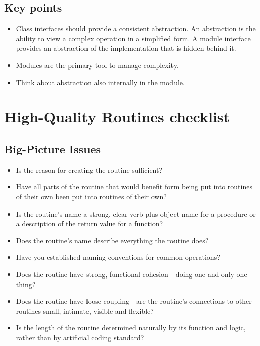 \subsection{Key points}
\begin{itemize}
\item Class interfaces should provide a consistent abstraction. An abstraction is the ability to view a complex operation in a simplified form. A module interface provides an abstraction of the implementation that is hidden behind it.
\item Modules are the primary tool to manage complexity.
\item Think about abstraction also internally in the module.
\end{itemize}

\newpage
\section{High-Quality Routines checklist}
\subsection{Big-Picture Issues}
\begin{itemize}
\item Is the reason for creating the routine sufficient?
\item Have all parts of the routine that would benefit form being put into routines of their own been put into routines of their own?
\item Is the routine's name a strong, clear verb-plus-object name for a procedure or a description of the return value for a function?
\item Does the routine's name describe everything the routine does?
\item Have you established naming conventions for common operations?
\item Does the routine have strong, functional cohesion - doing one and only one thing?
\item Does the routine have loose coupling - are the routine's connections to other routines small, intimate, visible and flexible?
\item Is the length of the routine determined naturally by its function and logic, rather than by artificial coding standard?
\end{itemize}
